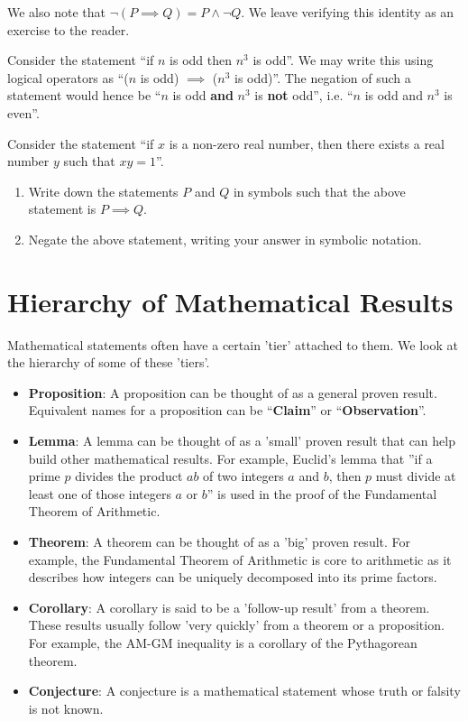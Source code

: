 We also note that $\lnot(P \implies Q) = P \land \lnot Q$. We leave verifying this identity as an exercise to the reader.

\begin{example}
    Consider the statement ``if $n$ is odd then $n^3$ is odd''. We may write this using logical operators as ``($n$ is odd) $\implies$ ($n^3$ is odd)''. The negation of such a statement would hence be ``$n$ is odd \textbf{and} $n^3$ is \textbf{not} odd'', i.e. ``$n$ is odd and $n^3$ is even''.
\end{example}

\begin{exercise}
    Consider the statement ``if $x$ is a non-zero real number, then there exists a real number $y$ such that $xy = 1$''.
    \begin{enumerate}[label=(\roman*)]
        \item Write down the statements $P$ and $Q$ in symbols such that the above statement is $P \implies Q$.
        \item Negate the above statement, writing your answer in symbolic notation.
    \end{enumerate}
\end{exercise}

\section{Hierarchy of Mathematical Results}
Mathematical statements often have a certain 'tier' attached to them. We look at the hierarchy of some of these 'tiers'.
\begin{itemize}
    \item \textbf{Proposition}: A proposition can be thought of as a general proven result. Equivalent names for a proposition can be ``\textbf{Claim}'' or ``\textbf{Observation}''.
    \item \textbf{Lemma}: A lemma can be thought of as a 'small' proven result that can help build other mathematical results. For example, Euclid's lemma that ''if a prime $p$ divides the product $ab$ of two integers $a$ and $b$, then $p$ must divide at least one of those integers $a$ or $b$'' is used in the proof of the Fundamental Theorem of Arithmetic.
    \item \textbf{Theorem}: A theorem can be thought of as a 'big' proven result. For example, the Fundamental Theorem of Arithmetic is core to arithmetic as it describes how integers can be uniquely decomposed into its prime factors.
    \item \textbf{Corollary}: A corollary is said to be a 'follow-up result' from a theorem. These results usually follow 'very quickly' from a theorem or a proposition. For example, the AM-GM inequality is a corollary of the Pythagorean theorem.
    \item \textbf{Conjecture}: A conjecture is a mathematical statement whose truth or falsity is not known.
\end{itemize}

